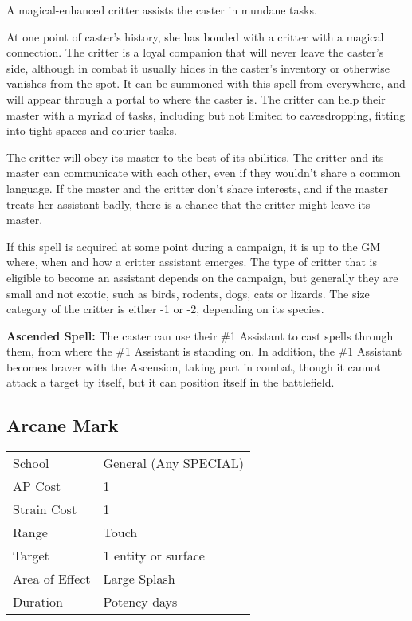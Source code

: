 \documentclass[11pt,a4paper,twocolumn]{book}
\begin{document}
\medskip

A magical-enhanced critter assists the caster in mundane tasks.

At one point of caster's history, she has bonded with a critter with a magical connection. The critter is a loyal companion that will never leave the caster's side, although in combat it usually hides in the caster's inventory or otherwise vanishes from the spot. It can be summoned with this spell from everywhere, and will appear through a portal to where the caster is. The critter can help their master with a myriad of tasks, including but not limited to eavesdropping, fitting into tight spaces and courier tasks.

The critter will obey its master to the best of its abilities. The critter and its master can communicate with each other, even if they wouldn't share a common language. If the master and the critter don't share interests, and if the master treats her assistant badly, there is a chance that the critter might leave its master.

If this spell is acquired at some point during a campaign, it is up to the GM where, when and how a critter assistant emerges. The type of critter that is eligible to become an assistant depends on the campaign, but generally they are small and not exotic, such as birds, rodents, dogs, cats or lizards. The size category of the critter is either -1 or -2, depending on its species.

\bigskip

\textbf{Ascended Spell:} The caster can use their \#1 Assistant to cast spells through them, from where the \#1 Assistant is standing on. In addition, the \#1 Assistant becomes braver with the Ascension, taking part in combat, though it cannot attack a target by itself, but it can position itself in the battlefield.


\subsection*{Arcane Mark}
{
	\begin{tabu} to 75mm{| X[l,4] | X[l,7] |}
		\hline
		School 			& General (Any SPECIAL) \\
		AP Cost	      	& 1 					\\
		Strain Cost     & 1 					\\
		Range     		& Touch 				\\
		Target      	& 1 entity or surface 	\\
		Area of Effect  & Large Splash 	 		\\
		Duration     	& Potency days 			\\ \hline
	\end{tabu}
	
}
\end{document}
